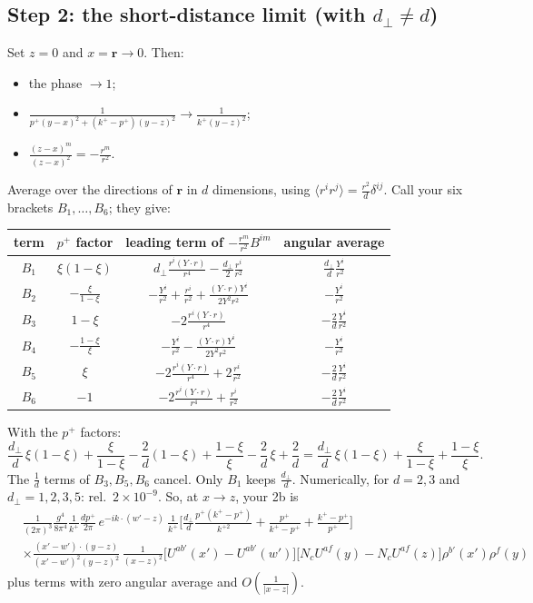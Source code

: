 \documentclass[10pt]{article}
\numberwithin{equation}{section}
\begin{document}
\subsection*{Step 2: the short-distance limit (with \texorpdfstring{$d_\perp\neq d$}{d_perp not equal to d})}
Set $z=0$ and $x=\mathbf r\to0$. Then:
\begin{itemize}
\item the phase $\to1$;
\item $\frac{1}{p^+(y-x)^2+(k^+-p^+)(y-z)^2}\to\frac{1}{k^+(y-z)^2}$;
\item $\frac{(z-x)^m}{(z-x)^2}=-\frac{r^m}{r^2}$.
\end{itemize}
Average over the directions of $\mathbf r$ in $d$ dimensions, using $\langle r^ir^j\rangle=\frac{r^2}{d}\delta^{ij}$. Call your six brackets $B_1,\dots,B_6$; they give:
\begin{center}\small
\begin{tabular}{@{}cccc@{}}\toprule
term & $p^+$ factor & leading term of $-\frac{r^m}{r^2}B^{im}$ & angular average\\\midrule
$B_1$ & $\xi(1-\xi)$ & $d_\perp\frac{r^i(Y\cdot r)}{r^4}-\frac{d_\perp}{2}\frac{r^i}{r^2}$ & $\frac{d_\perp}{d}\frac{Y^i}{r^2}$\\
$B_2$ & $-\frac{\xi}{1-\xi}$ & $-\frac{Y^i}{r^2}+\frac{r^i}{r^2}+\frac{(Y\cdot r)Y^i}{2Y^2r^2}$ & $-\frac{Y^i}{r^2}$\\
$B_3$ & $1-\xi$ & $-2\frac{r^i(Y\cdot r)}{r^4}$ & $-\frac2d\frac{Y^i}{r^2}$\\
$B_4$ & $-\frac{1-\xi}{\xi}$ & $-\frac{Y^i}{r^2}-\frac{(Y\cdot r)Y^i}{2Y^2r^2}$ & $-\frac{Y^i}{r^2}$\\
$B_5$ & $\xi$ & $-2\frac{r^i(Y\cdot r)}{r^4}+2\frac{r^i}{r^2}$ & $-\frac2d\frac{Y^i}{r^2}$\\
$B_6$ & $-1$ & $-2\frac{r^i(Y\cdot r)}{r^4}+\frac{r^i}{r^2}$ & $-\frac2d\frac{Y^i}{r^2}$\\\bottomrule
\end{tabular}
\end{center}
With the $p^+$ factors:
\begin{equation}
\frac{d_\perp}{d}\,\xi(1-\xi)+\frac{\xi}{1-\xi}-\frac{2}{d}(1-\xi)+\frac{1-\xi}{\xi}-\frac2d\,\xi+\frac2d=\frac{d_\perp}{d}\,\xi(1-\xi)+\frac{\xi}{1-\xi}+\frac{1-\xi}{\xi}.
\label{eq:coef}
\end{equation}
The $\frac1d$ terms of $B_3,B_5,B_6$ cancel. Only $B_1$ keeps $\frac{d_\perp}{d}$. Numerically, for $d=2,3$ and $d_\perp=1,2,3,5$: rel.\ $2\times10^{-9}$. So, at $x\to z$, your 2b is
\begin{align*}
&\frac{1}{(2\pi)^{3}}\frac{g^{4}}{8\pi^{4}}\frac{1}{k^{+}}\frac{dp^+}{2\pi}\,e^{-ik\cdot(w'-z)}\,\frac{1}{k^{+}}\Big[\frac{d_\perp}{d}\frac{p^{+}(k^{+}-p^{+})}{k^{+2}}+\frac{p^{+}}{k^{+}-p^{+}}+\frac{k^{+}-p^{+}}{p^{+}}\Big]\\
&\times\frac{(x'-w')\cdot(y-z)}{(x'-w')^{2}(y-z)^{2}}\,\frac{1}{(x-z)^{2}}\Big[U^{ab'}(x')-U^{ab'}(w')\Big]\Big[N_cU^{af}(y)-N_cU^{af}(z)\Big]\rho^{b'}(x')\rho^{f}(y)
\end{align*}
plus terms with zero angular average and $O(\frac1{|x-z|})$.
\end{document}
